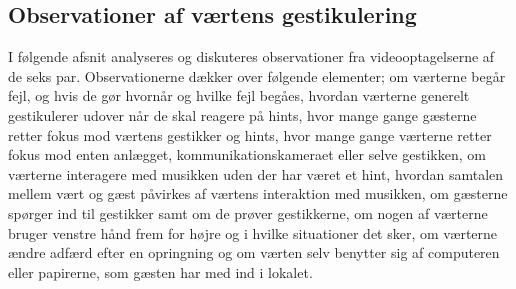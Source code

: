 \subsection{Observationer af værtens gestikulering}
\label{TestresultaterSocialAcceptGestikkerObservationer}
%
I følgende afsnit analyseres og diskuteres observationer fra videooptagelserne af de seks par. Observationerne dækker over følgende elementer; om værterne begår fejl, og hvis de gør hvornår og hvilke fejl begåes, hvordan værterne generelt gestikulerer udover når de skal reagere på hints, hvor mange gange gæsterne retter fokus mod værtens gestikker og hints, hvor mange gange værterne retter fokus mod enten anlægget, kommunikationskameraet eller selve gestikken, om værterne interagere med musikken uden der har været et hint, hvordan samtalen mellem vært og gæst påvirkes af værtens interaktion med musikken, om gæsterne spørger ind til gestikker samt om de prøver gestikkerne, om nogen af værterne bruger venstre hånd frem for højre og i hvilke situationer det sker, om værterne ændre adfærd efter en opringning og om værten selv benytter sig af computeren eller papirerne, som gæsten har med ind i lokalet.   
 
